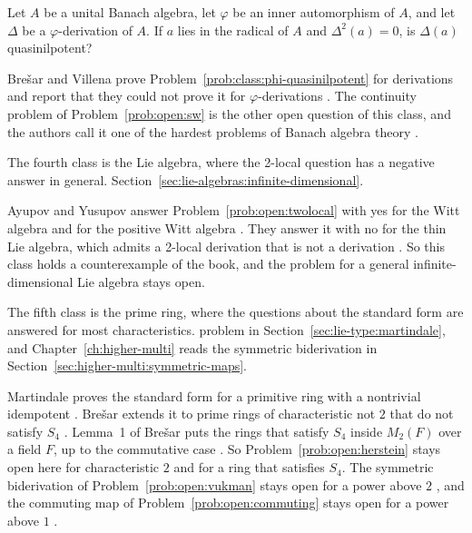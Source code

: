 \begin{problem}\label{prob:class:phi-quasinilpotent}
Let $A$ be a unital Banach algebra, let $\varphi$ be an inner automorphism of
$A$, and let $\Delta$ be a $\varphi$-derivation of $A$.
If $a$ lies in the radical of $A$ and $\Delta^2(a)=0$, is $\Delta(a)$
quasinilpotent?
\end{problem}

Bre\v{s}ar and Villena prove Problem~\ref{prob:class:phi-quasinilpotent} for
derivations and report that they could not prove it for $\varphi$-derivations
\cite[Remark~5.3, p.~720]{BresarVillena2002}. The continuity problem of
Problem~\ref{prob:open:sw} is the other open question of this class, and the
authors call it one of the hardest problems of Banach algebra theory
\cite[p.~710]{BresarVillena2002}.

The fourth class is the Lie algebra, where the 2-local question has a negative
answer in general.
Section~\ref{sec:lie-algebras:infinite-dimensional}.

Ayupov and Yusupov answer Problem~\ref{prob:open:twolocal} with yes for the
Witt algebra \cite[Theorem~4.1, p.~4]{AyupovYusupov2020} and for the positive
Witt algebra \cite[Theorem~4.4, p.~6]{AyupovYusupov2020}. They answer it with
no for the thin Lie algebra, which admits a 2-local derivation that is not a
derivation \cite[Theorem~4.8, p.~8]{AyupovYusupov2020}. So this class holds a
counterexample of the book, and the problem for a general infinite-dimensional
Lie algebra stays open.

The fifth class is the prime ring, where the questions about the standard form
are answered for most characteristics.
problem in Section~\ref{sec:lie-type:martindale}, and
Chapter~\ref{ch:higher-multi} reads the symmetric biderivation in
Section~\ref{sec:higher-multi:symmetric-maps}.

Martindale proves the standard form for a primitive ring with a nontrivial
idempotent \cite[Theorem~2, p.~187]{Martindale1964}.
Bre\v{s}ar extends it to prime rings of characteristic not $2$ that do not
satisfy $S_4$ \cite[Theorem~5, p.~529]{Bresar1993LieTAMS}.
Lemma~1 of Bre\v{s}ar puts the rings that satisfy $S_4$ inside $M_2(F)$ over a
field $F$, up to the commutative case
\cite[Lemma~1, p.~530]{Bresar1993LieTAMS}.
So Problem~\ref{prob:open:herstein} stays open here for characteristic $2$ and
for a ring that satisfies $S_4$.
The symmetric biderivation of Problem~\ref{prob:open:vukman} stays open for a
power above $2$ \cite[pp.~188--189]{Vukman1990Two}, and the commuting map of
Problem~\ref{prob:open:commuting} stays open for a power above $1$
\cite[p.~334]{LeeTK1997Centralizing}.

